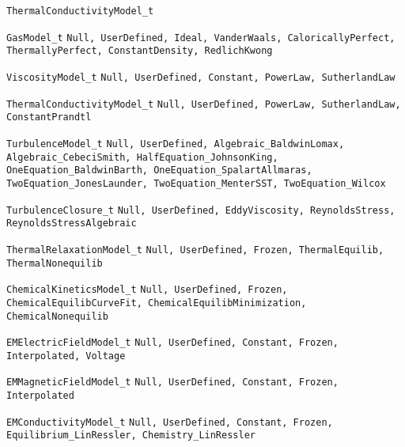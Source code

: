 \begin{Ventryi}{\texttt{ThermalConductivityModel\_t}}\raggedright
\item [\texttt{GasModel\_t}]
      \texttt{Null, UserDefined, Ideal, VanderWaals, CaloricallyPerfect,
      ThermallyPerfect, ConstantDensity, RedlichKwong}
\item [\texttt{ViscosityModel\_t}]
      \texttt{Null, UserDefined, Constant, PowerLaw, SutherlandLaw}
\item [\texttt{ThermalConductivityModel\_t}]
      \texttt{Null, UserDefined, PowerLaw, SutherlandLaw, ConstantPrandtl}
\item [\texttt{TurbulenceModel\_t}]
      \texttt{Null, UserDefined, Algebraic\_BaldwinLomax,
      Algebraic\_CebeciSmith, HalfEquation\_JohnsonKing,
      OneEquation\_BaldwinBarth, OneEquation\_SpalartAllmaras,
      TwoEquation\_JonesLaunder, TwoEquation\_MenterSST,
      TwoEquation\_Wilcox}
\item [\texttt{TurbulenceClosure\_t}]
      \texttt{Null, UserDefined, EddyViscosity, ReynoldsStress,
      ReynoldsStressAlgebraic}
\item [\texttt{ThermalRelaxationModel\_t}]
      \texttt{Null, UserDefined, Frozen, ThermalEquilib,
      ThermalNonequilib}
\item [\texttt{ChemicalKineticsModel\_t}]
      \texttt{Null, UserDefined, Frozen,
      ChemicalEquilibCurveFit, ChemicalEquilibMinimization,
      ChemicalNonequilib}
\item [\texttt{EMElectricFieldModel\_t}]
      \texttt{Null, UserDefined, Constant, Frozen, Interpolated,
      Voltage}
\item [\texttt{EMMagneticFieldModel\_t}]
      \texttt{Null, UserDefined, Constant, Frozen, Interpolated}
\item [\texttt{EMConductivityModel\_t}]
      \texttt{Null, UserDefined, Constant, Frozen, Equilibrium\_LinRessler,
      Chemistry\_LinRessler}
\end{Ventryi}

